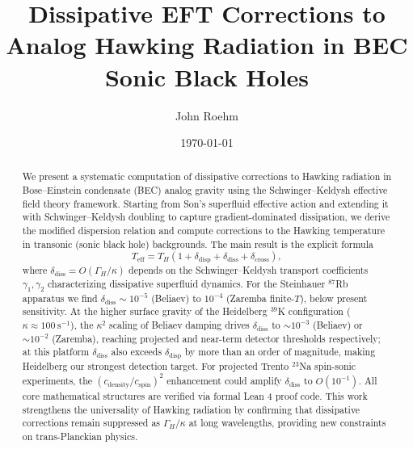 \documentclass[aps,prl,twocolumn,superscriptaddress,nofootinbib,amsmath,amssymb]{revtex4-2}
\begin{document}
\title{Dissipative EFT Corrections to Analog Hawking Radiation in BEC Sonic Black Holes}

\author{John Roehm}

\date{\today}

\begin{abstract}
We present a systematic computation of dissipative corrections to Hawking radiation in Bose--Einstein condensate (BEC) analog gravity using the Schwinger--Keldysh effective field theory framework. Starting from Son's superfluid effective action and extending it with Schwinger--Keldysh doubling to capture gradient-dominated dissipation, we derive the modified dispersion relation and compute corrections to the Hawking temperature in transonic (sonic black hole) backgrounds. The main result is the explicit formula
\begin{equation*}
T_{\text{eff}} = T_H \left(1 + \delta_{\text{disp}} + \delta_{\text{diss}} + \delta_{\text{cross}}\right),
\end{equation*}
where $\delta_{\text{diss}} = O(\Gamma_H / \kappa)$ depends on the Schwinger--Keldysh transport coefficients $\gamma_1, \gamma_2$ characterizing dissipative superfluid dynamics. For the Steinhauer $^{87}$Rb apparatus we find $\delta_{\text{diss}} \sim 10^{-5}$ (Beliaev) to $10^{-4}$ (Zaremba finite-$T$), below present sensitivity. At the higher surface gravity of the Heidelberg $^{39}$K configuration ($\kappa \approx 100~\text{s}^{-1}$), the $\kappa^2$ scaling of Beliaev damping drives $\delta_{\text{diss}}$ to ${\sim}10^{-3}$ (Beliaev) or ${\sim}10^{-2}$ (Zaremba), reaching projected and near-term detector thresholds respectively; at this platform $\delta_{\text{diss}}$ also exceeds $\delta_{\text{disp}}$ by more than an order of magnitude, making Heidelberg our strongest detection target. For projected Trento $^{23}$Na spin-sonic experiments, the $(c_{\text{density}}/c_{\text{spin}})^2$ enhancement could amplify $\delta_{\text{diss}}$ to $O(10^{-1})$. All core mathematical structures are verified via formal Lean 4 proof code. This work strengthens the universality of Hawking radiation by confirming that dissipative corrections remain suppressed as $\Gamma_H / \kappa$ at long wavelengths, providing new constraints on trans-Planckian physics.
\end{abstract}

\maketitle
\end{document}
